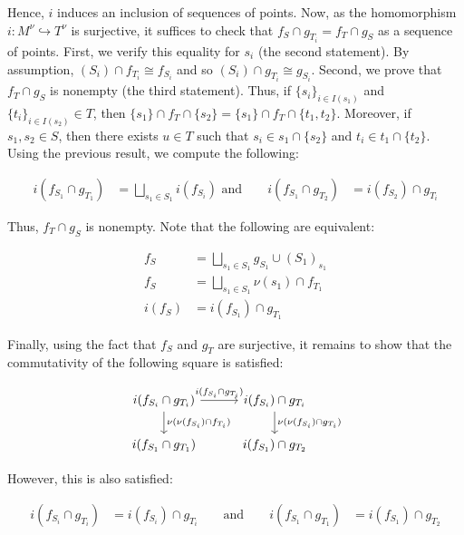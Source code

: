 \documentclass[a4paper,reqno,oneside]{article}
\begin{document}
{Hence, $i$ induces an inclusion of sequences of points.  Now, as the homomorphism $i : M^\nu \hookrightarrow T^\nu$ is surjective, it suffices to check that $f_S\cap g_{T_i}=f_T \cap g_S$ as a sequence of points.  First, we verify this equality for $s_i$ (the second statement).   By assumption, $(S_i)\cap f_{T_i} \cong f_{S_i}$ and so $(S_i)\cap g_{T_i} \cong g_{S_i}$.  Second, we prove that $f_T \cap g_S$ is nonempty (the third statement).  Thus, if $\{s_i\}_{i\in I(s_1)}$ and $\{t_i\}_{i\in I(s_2)}\in T$, then $\{s_1\}\cap f_{T}\cap\{s_2\} = \{s_1\}\cap f_{T}\cap\{t_1,t_2\}$.  Moreover, if $s_1,s_2\in S$, then there exists $u\in T$ such that $s_i\in s_1\cap\{s_2\}$ and $t_i\in t_1\cap\{t_2\}$.  Using the previous result, we compute the following:

\begin{align*}
i(f_{S_1}\cap g_{T_1}) &= \bigsqcup_{s_1\in S_1} i(f_{S_i}) \text{ and} \qquad
i(f_{S_1}\cap g_{T_2}) &= i(f_{S_2})\cap g_{T_i}
\end{align*}

Thus, $f_T \cap g_S$ is nonempty.  Note that the following are equivalent:

\begin{align*}
f_S &= \bigsqcup_{s_1\in S_1} g_{S_1} \cup (S_1)_{s_1} \\
f_S &= \bigsqcup_{s_1\in S_1} \nu(s_1) \cap f_{T_1} \\
i(f_S) &= i(f_{S_1}) \cap g_{T_1}
\end{align*}

Finally, using the fact that $f_S$ and $g_T$ are surjective, it remains to show that the commutativity of the following square is satisfied:

\begin{equation*}
\begin{tikzcd}[column sep=1cm]
i(f_{S_i}\cap g_{T_i}) \arrow[r,"i(f_{S_i}\cap g_{T_i})"] \arrow[d,"\nu(\nu(f_{S_i})\cap f_{T_i})"]
& i(f_{S_i}) \cap g_{T_i} \arrow[d,"\nu(\nu(f_{S_i})\cap g_{T_i})"] \\
i(f_{S_1}\cap g_{T_1}) & i(f_{S_1}) \cap g_{T_2}
\end{tikzcd}
\end{equation*}

However, this is also satisfied:

\begin{align*}
i(f_{S_i}\cap g_{T_i}) &= i(f_{S_i})\cap g_{T_i}\qquad \text{and} \qquad
i(f_{S_1}\cap g_{T_1}) &= i(f_{S_1})\cap g_{T_2}
\end{align*}


}
\end{document}
